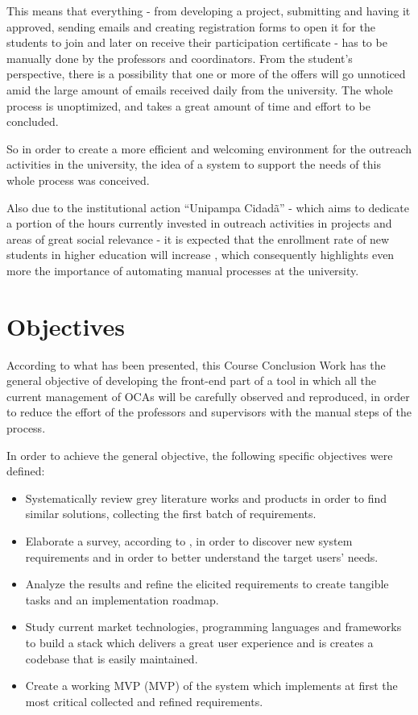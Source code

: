 This means that everything - from developing a project, submitting and having it approved, sending emails and creating registration forms to open it for the students to join and later on receive their participation certificate - has to be manually done by the professors and coordinators. From the student's perspective, there is a possibility that one or more of the offers will go unnoticed amid the large amount of emails received daily from the university. The whole process is unoptimized, and takes a great amount of time and effort to be concluded.

So in order to create a more efficient and welcoming environment for the outreach activities in the university, the idea of a system to support the needs of this whole process was conceived.

Also due to the institutional action ``Unipampa Cidadã'' - which aims to dedicate a portion of the hours currently invested in outreach activities in projects and areas of great social relevance - it is expected that the enrollment rate of new students in higher education will increase \cite{unipampacidada}, which consequently highlights even more the importance of automating manual processes at the university.

\section{Objectives}\label{sec:objectives}

According to what has been presented, this Course Conclusion Work has the general objective of developing the front-end part of a tool in which all the current management of \acp{OCA} will be carefully observed and reproduced, in order to reduce the effort of the professors and supervisors with the manual steps of the process.

In order to achieve the general objective, the following specific objectives were defined:

\begin{itemize}
  \item Systematically review grey literature works and products in order to find similar solutions, collecting the first batch of requirements.
  \item Elaborate a survey, according to \cite{kasunic2005designing}, in order to discover new system requirements and in order to better understand the target users' needs.
  \item Analyze the results and refine the elicited requirements to create tangible tasks and an implementation roadmap.
  \item Study current market technologies, programming languages and frameworks to build a stack which delivers a great user experience and is creates a codebase that is easily maintained.
  \item Create a working \acl{MVP} (\ac{MVP}) of the system which implements at first the most critical collected and refined requirements.
\end{itemize}


